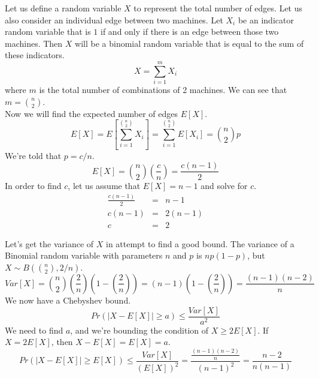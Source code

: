 \documentclass{article}
\begin{document}
Let us define a random variable $X$ to represent the total number of edges. Let 
us also consider an individual edge between two machines. Let $X_i$ be an 
indicator random variable that is $1$ if and only if there is an edge between 
those two machines. Then $X$ will be a binomial random variable that is equal 
to the sum of these indicators.
\begin{equation*}
X = \sum_{i=1}^m X_i
\end{equation*}
where $m$ is the total number of combinations of 2 machines. We can see that $m 
= {n\choose 2}$.\\
Now we will find the expected number of edges $E[X]$.
\begin{equation*}
E[X] = E[\sum_{i=1}^{n\choose 2} X_i] = \sum_{i=1}^{n\choose 2} E[X_i] = 
{n\choose 2}p
\end{equation*}
We're told that $p=c/n$.
\begin{equation*}
E[X] = {n\choose 2}\left(\frac{c}{n}\right) = \frac{c(n-1)}{2}
\end{equation*}
In order to find $c$, let us assume that $E[X] = n-1$ and solve for $c$.
\begin{eqnarray*}
\frac{c(n-1)}{2} & = & n-1\\
c(n-1) & = & 2(n-1)\\
c & = & 2
\end{eqnarray*}

Let's get the variance of $X$ in attempt to find a good bound. The variance of 
a Binomial random variable with parameters $n$ and $p$ is $np(1-p)$, but $X\sim 
B({n\choose 2},2/n)$.
\begin{equation*}
Var[X] = {n\choose 2}\left(\frac{2}{n}\right)(1-\left(\frac{2}{n}\right)) = 
	(n-1)(1-\left(\frac{2}{n}\right)) = \frac{(n-1)(n-2)}{n}
\end{equation*}
We now have a Chebyshev bound.
\begin{equation*}
Pr(|X-E[X]|\geq a) \leq \frac{Var[X]}{a^2}
\end{equation*}
We need to find $a$, and we're bounding the condition of $X \geq 2E[X]$. If 
$X=2E[X]$, then $X-E[X] = E[X] = a$.
\begin{equation*}
Pr(|X-E[X]| \geq E[X]) \leq \frac{Var[X]}{(E[X])^2} = 
\frac{\frac{(n-1)(n-2)}{n}}{(n-1)^2} = \frac{n-2}{n(n-1)}
\end{equation*}

\pagebreak

\end{document}
